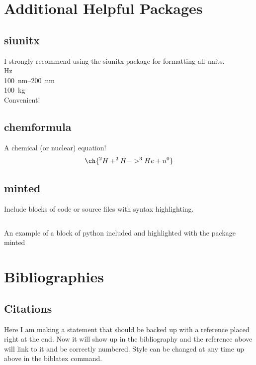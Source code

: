 \documentclass[hidelinks, 12pt]{article}%
\begin{document}
    \section{Additional Helpful Packages}
        \subsection{siunitx}
            I strongly recommend using the siunitx package for formatting all units.
            \\\si{\hertz}
            \\\SIrange{100}{200}{\nano\meter}
            \\\SI{100}{\kilo\gram}
            \\Convenient!

        \subsection{chemformula}
            A chemical (or nuclear) equation!
            \begin{equation}
                \ch{
                ^{2}H + ^{2}H -> ^{3}He + n^{0}
                }
                \label{eqt:nucEnerReleased}
            \end{equation}

        \subsection{minted}
            Include blocks of code or source files with syntax highlighting.
            \begin{listing}[H]
                \inputminted{python}{./demo.py}
                \caption{An example of a block of python included and highlighted with the package minted}
                \label{lst:pythonExample}
            \end{listing}

    \section{Bibliographies}
        \subsection{Citations}
            Here I am making a statement that should be backed up with a reference placed right at the end. \cite{ref:01}
            Now it will show up in the bibliography and the reference above will link to it and be correctly numbered.
            Style can be changed at any time up above in the biblatex command.
\end{document}
